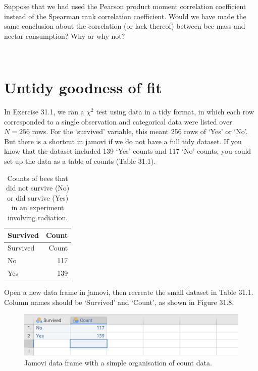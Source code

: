 \documentclass[
]{scrbook}
\begin{document}
Suppose that we had used the Pearson product moment correlation coefficient instead of the Spearman rank correlation coefficient.
Would we have made the same conclusion about the correlation (or lack thereof) between bee mass and nectar consumption?
Why or why not?

\begin{verbatim}


\end{verbatim}

\hypertarget{untidy-goodness-of-fit}{%
\section{Untidy goodness of fit}\label{untidy-goodness-of-fit}}

In Exercise 31.1, we ran a \(\chi^{2}\) test using data in a tidy format, in which each row corresponded to a single observation and categorical data were listed over \(N = 256\) rows.
For the `survived' variable, this meant 256 rows of `Yes' or `No'.
But there is a shortcut in jamovi if we do not have a full tidy dataset.
If you know that the dataset included 139 `Yes' counts and 117 `No' counts, you could set up the data as a table of counts (Table 31.1).

\begin{longtable}[]{@{}lr@{}}
\caption{\label{tab:unnamed-chunk-159}Counts of bees that did not survive (No) or did survive (Yes) in an experiment involving radiation.}\tabularnewline
\toprule
Survived & Count \\
\midrule
\endfirsthead
\toprule
Survived & Count \\
\midrule
\endhead
No & 117 \\
Yes & 139 \\
\bottomrule
\end{longtable}

Open a new data frame in jamovi, then recreate the small dataset in Table 31.1.
Column names should be `Survived' and `Count', as shown in Figure 31.8.

\begin{figure}
\includegraphics[width=1\linewidth]{img/jamovi_simple_counts} \caption{Jamovi data frame with a simple organisation of count data.}\label{fig:unnamed-chunk-160}
\end{figure}
\end{document}
